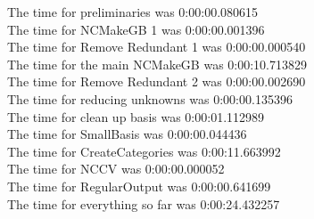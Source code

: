 \documentclass[rep10,leqno]{report}
\begin{document}
\noindent
The time for preliminaries was 0:00:00.080615\\
The time for NCMakeGB 1 was 0:00:00.001396\\
The time for Remove Redundant 1 was 0:00:00.000540\\
The time for the main NCMakeGB was 0:00:10.713829\\
The time for Remove Redundant 2 was 0:00:00.002690\\
The time for reducing unknowns was 0:00:00.135396\\
The time for clean up basis was 0:00:01.112989\\
The time for SmallBasis was 0:00:00.044436\\
The time for CreateCategories was 0:00:11.663992\\
The time for NCCV was 0:00:00.000052\\
The time for RegularOutput was 0:00:00.641699\\
The time for everything so far was 0:00:24.432257\\
\end{document}
